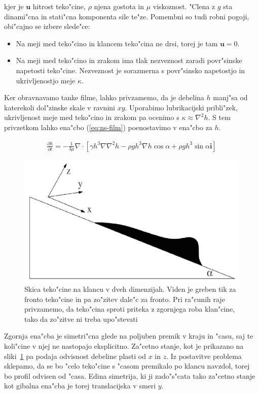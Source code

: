 \documentclass[a4paper,12pt]{article}
\renewcommand{\vec}{\mathbf}
\begin{document}
kjer je $\vec u$ hitrost teko"cine, $\rho$ njena gostota in $\mu$ viskoznost. "Clena z $g$ sta dinami"cna in stati"cna komponenta sile te"ze. Pomembni so tudi robni pogoji, obi"cajno se izbere slede"ce:

\begin{itemize}
 \item Na meji med teko"cino in klancem teko"cina ne drsi, torej je tam $\vec u = 0$. 
 \item Na meji med teko"cino in zrakom ima tlak nezveznost zaradi povr"sinske napetosti teko"cine. Nezveznost je sorazmerna s povr"sinsko napetostjo in ukrivljenostjo meje $\kappa$. 
\end{itemize}

Ker obravnavamo tanke filme, lahko privzamemo, da je debelina $h$ manj"sa od katerekoli dol"zinske skale v ravnini $xy$. Uporabimo lubrikacijski pribli"zek, ukrivljenost meje med teko"cino in zrakom pa ocenimo s $\kappa \approx \nabla^2 h$. S tem privzetkom lahko ena"cbo (\ref{eq:ns-film}) poenostavimo v ena"cbo za $h$. 

\begin{align}
\label{eq:ns-film-h}
 \frac{\partial h}{\partial t} = -\frac{1}{3\mu}\nabla \cdot \left[ \gamma h^3 \nabla \nabla^2 h - \rho g h^3 \nabla h \cos \alpha + \rho g h^3 \sin \alpha \vec i \right]
\end{align}

\begin{figure}[h]
\centering
 \includegraphics[width=.6\textwidth]{./Slike/film-skica}
\caption{Skica teko"cine na klancu v dveh dimenzijah. Viden je greben tik za fronto teko"cine in pa zo"zitev dale"c za fronto. Pri ra"cunih raje privzamemo, da teko"cina sproti priteka z zgornjega roba klan"cine, tako da zo"zitve ni treba upo"stevati}
\label{fig:film-skica}
\end{figure}

Zgornja ena"cba je simetri"cna glede na poljuben premik v kraju in "casu, saj te koli"cine v njej ne nastopajo eksplicitno. Za"cetno stanje, kot je prikazano na sliki~\ref{fig:film-skica} pa podaja odvisnost debeline plasti od $x$ in $z$. Iz postavitve problema sklepamo, da se bo "celo teko"cine s "casom premikalo po klancu navzdol, torej bo profil odvisen od "casa. Edina simetrija, ki ji zado"s"cata tako za"cetno stanje kot gibalna ena"cba je torej translacijska v smeri $y$. 
\end{document}
